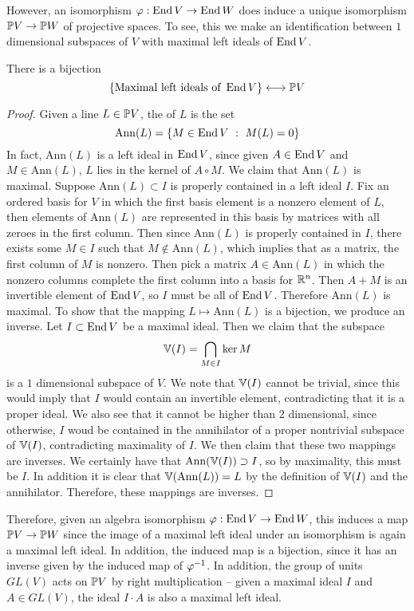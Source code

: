 %
However, an isomorphism $\varphi : \End V \to \End W$ does induce a unique isomorphism
$\P V \to \P W$ of projective spaces. To see, this we make an identification
between $1$ dimensional subspaces of $V$ with maximal left ideals of $\End V$.
%
\begin{prop}
 There is a bijection
 \[
  \set{\text{Maximal left ideals of } \End V} \longleftrightarrow \P V
 \]
\end{prop}
%
\begin{proof}
 Given a line $L \in \P V$, the  of $L$ is the set
 \[
  \mathrm{Ann}(L) = \set{M \in \End V ~:~ M(L) = 0}
 \]
 In fact, $\mathrm{Ann}(L)$
 is a left ideal in $\End V$, since given $A \in \End V$ and $M \in \mathrm{Ann}(L)$,
 $L$ lies in the kernel of $A \circ M$. We claim that $\mathrm{Ann}(L)$ is maximal.
 Suppose $\mathrm{Ann}(L) \subset I$ is properly contained in a left ideal $I$.
 Fix an ordered basis for $V$ in which the first basis element is a
 nonzero element of $L$, then elements of $\mathrm{Ann}(L)$ are represented in this basis
 by matrices with all zeroes in the first column. Then since $\mathrm{Ann}(L)$ is
 properly contained in $I$, there exists some $M \in I$ such that
 $M \notin \mathrm{Ann}(L)$, which implies that as a matrix, the first column
 of $M$ is nonzero. Then pick a matrix $A \in \mathrm{Ann}(L)$ in which
 the nonzero columns complete the first column into a basis for $\R^n$. Then
 $A + M$ is an invertible element of $\End V$, so $I$ must be all of $\End V$.
 Therefore $\mathrm{Ann}(L)$ is maximal. To show that the mapping
 $L \mapsto \mathrm{Ann}(L)$ is a bijection, we produce an inverse. Let
 $I \subset \End V$ be a maximal ideal. Then we claim that the subspace
 \[
  \V(I) = \bigcap_{M \in I}\ker M
 \]
 is a $1$ dimensional subspace of $V$. We note that $\V(I)$ cannot be trivial,
 since this would imply that $I$ would contain an invertible element, contradicting
 that it is a proper ideal. We also see that it cannot be higher than $2$ dimensional,
 since otherwise, $I$ woud be contained in the annihilator of a proper nontrivial
 subspace of $\V(I)$, contradicting maximality of $I$. We then claim that
 these two mappings are inverses. We certainly have that
 $\mathrm{Ann}(\V(I)) \supset I$, so by maximality, this must be $I$. In addition
 it is clear that $\V(\mathrm{Ann}(L)) = L$ by the definition of $\V(I)$ and
 the annihilator. Therefore, these mappings are inverses.
\end{proof}
%
Therefore, given an algebra isomorphism $\varphi : \End V \to \End W$, this
induces a map $\P V \to \P W$ since the image of a maximal left ideal under an
isomorphism is again a maximal left ideal. In addition, the induced map is a bijection,
since it has an inverse given by the induced map of $\varphi\inv$. In
addition, the group of units $GL(V)$ acts on $\P V$ by right multiplication --
given a maximal ideal $I$ and $A \in GL(V)$, the ideal $I \cdot A$ is also
a maximal left ideal. \\


